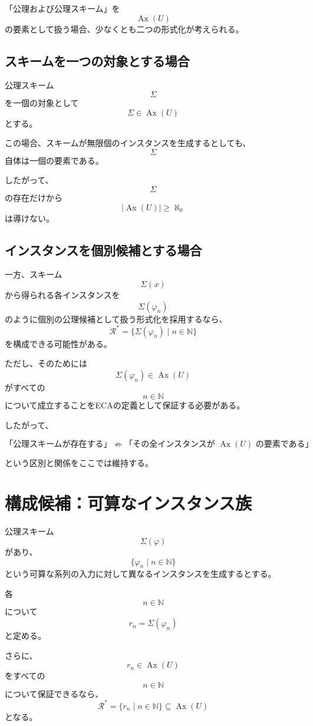 \documentclass[a4paper,11pt]{article}
\begin{document}
「公理および公理スキーム」を
\[
\operatorname{Ax}(U)
\]
の要素として扱う場合、少なくとも二つの形式化が考えられる。

\subsection{スキームを一つの対象とする場合}

公理スキーム
\[
\Sigma
\]
を一個の対象として
\[
\Sigma\in\operatorname{Ax}(U)
\]
とする。

この場合、スキームが無限個のインスタンスを生成するとしても、
\[
\Sigma
\]
自体は一個の要素である。

したがって、
\[
\Sigma
\]
の存在だけから
\[
|\operatorname{Ax}(U)|\ge\aleph_0
\]
は導けない。

\subsection{インスタンスを個別候補とする場合}

一方、スキーム
\[
\Sigma(x)
\]
から得られる各インスタンスを
\[
\Sigma(\varphi_n)
\]
のように個別の公理候補として扱う形式化を採用するなら、
\[
\mathcal{R}^*
=
\{
\Sigma(\varphi_n)\mid n\in\mathbb{N}
\}
\]
を構成できる可能性がある。

ただし、そのためには
\[
\Sigma(\varphi_n)\in\operatorname{Ax}(U)
\]
がすべての
\[
n\in\mathbb{N}
\]
について成立することをECAの定義として保証する必要がある。

したがって、

\[
\boxed{
\text{「公理スキームが存在する」}
\not\Rightarrow
\text{「その全インスタンスが }\operatorname{Ax}(U)\text{ の要素である」}
}
\]

という区別と関係をここでは維持する。

\section{構成候補：可算なインスタンス族}

公理スキーム
\[
\Sigma(\varphi)
\]
があり、
\[
\{\varphi_n\mid n\in\mathbb{N}\}
\]
という可算な系列の入力に対して異なるインスタンスを生成するとする。

各
\[
n\in\mathbb{N}
\]
について
\[
r_n=\Sigma(\varphi_n)
\]
と定める。

さらに、
\[
r_n\in\operatorname{Ax}(U)
\]
をすべての
\[
n\in\mathbb{N}
\]
について保証できるなら、
\[
\mathcal{R}^*
=
\{r_n\mid n\in\mathbb{N}\}
\subseteq\operatorname{Ax}(U)
\]
となる。
\end{document}
